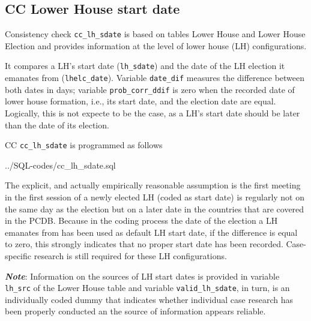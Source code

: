 \subsection{CC Lower House start date}
Consistency check \texttt{\footnotesize cc\_lh\_sdate} is based on tables Lower House and Lower House Election and provides information at the level of lower house (LH) configurations.

It compares a LH's start date (\texttt{\footnotesize lh\_sdate}) and the date of the LH election it emanates from (\texttt{\footnotesize lhelc\_date}). Variable \texttt{\footnotesize date\_dif} measures the difference between both dates in days; variable \texttt{\footnotesize prob\_corr\_ddif} is zero when the recorded date of lower house formation, i.e., its start date, and the election date are equal. 
Logically, this is not expecte to be the case, as a LH's start date should be later than the date of its election.

CC \texttt{\footnotesize cc\_lh\_sdate} is programmed as follows

%
{../SQL-codes/cc_lh_sdate.sql}



The explicit, and actually empirically reasonable assumption is the first meeting in the first session of a newly elected LH (coded as start date) is regularly not on the same day as the election but on a later date in the countries that are covered in the PCDB. 
Because in the coding process the date of the election a LH emanates from has been used as default LH start date, if the difference is equal to zero, this strongly indicates that no proper start date has been recorded. Case-specific research is still required for these LH configurations.

\emph{\textbf{Note}}: Information on the sources of LH start dates is provided in variable \texttt{\footnotesize lh\_src} of the Lower House table and variable \texttt{\footnotesize valid\_lh\_sdate}, in turn, is an individually coded dummy that indicates whether individual case research has been properly conducted an the source of information appears reliable.
